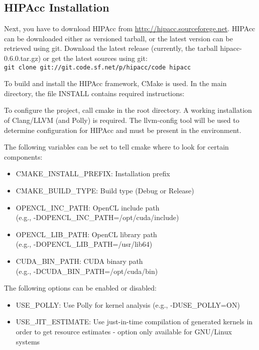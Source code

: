 \subsection{\ac{HIPAcc} Installation}
Next, you have to download \ac{HIPAcc} from
\href{http://hipacc.sourceforege.net}{http://hipacc.sourceforege.net}.
\ac{HIPAcc} can be downloaded either as versioned tarball, or the latest version
can be retrieved using git. Download the latest release (currently, the tarball
hipacc-0.6.0.tar.gz) or get the latest sources using git:\\
{\tt git clone git://git.code.sf.net/p/hipacc/code hipacc}

To build and install the \ac{HIPAcc} framework, CMake is used. In the main
directory, the file INSTALL contains required instructions:

To configure the project, call cmake in the root directory. A working
installation of Clang/LLVM (and Polly) is required. The llvm-config tool will be
used to determine configuration for \ac{HIPAcc} and must be present in the
environment.

The following variables can be set to tell cmake where to look for certain components:
\begin{itemize}
    \item CMAKE\_INSTALL\_PREFIX:   Installation prefix
    \item CMAKE\_BUILD\_TYPE:       Build type (Debug or Release)
    \item OPENCL\_INC\_PATH:        OpenCL include path\\(e.g., -DOPENCL\_INC\_PATH=/opt/cuda/include)
    \item OPENCL\_LIB\_PATH:        OpenCL library path\\(e.g., -DOPENCL\_LIB\_PATH=/usr/lib64)
    \item CUDA\_BIN\_PATH:          CUDA binary path\\(e.g., -DCUDA\_BIN\_PATH=/opt/cuda/bin)
\end{itemize}

The following options can be enabled or disabled:
\begin{itemize}
    \item USE\_POLLY: Use Polly for kernel analysis (e.g., -DUSE\_POLLY=ON)
    \item USE\_JIT\_ESTIMATE: Use just-in-time compilation of generated kernels
    in order to get resource estimates - option only available for GNU/Linux
    systems
\end{itemize}

